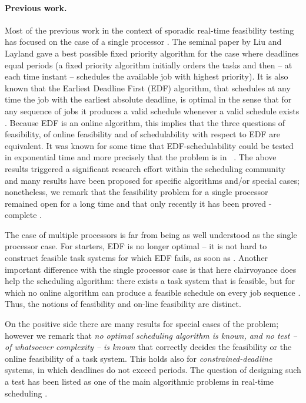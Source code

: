 \documentclass{llncs}
\newcommand{\conp}{\ccconp}
\begin{document}
\paragraph{Previous work.}
Most of the previous work in the context of sporadic real-time feasibility testing has focused on the case of a single processor \cite{Baruah:2003}. The seminal paper by Liu and Layland  \cite{Liu:1973} gave a best possible fixed priority algorithm for the case where deadlines equal periods (a fixed priority algorithm initially orders the tasks and then -- at each time instant -- schedules the available job with highest priority).  
It is also known that  the Earliest Deadline First (EDF) algorithm, that schedules at any time the job with the earliest absolute deadline, is optimal in the sense that for any sequence of jobs it produces a valid schedule whenever a valid schedule exists \cite{Dertouzos:1974}. Because EDF is an online algorithm, this implies that the three questions of feasibility, of online feasibility and of schedulability with respect to EDF are equivalent. It was known for some time that EDF-schedulability could be tested in exponential time and more precisely that the problem is in \conp\ \cite{Baruah:1990}. 
The above results triggered a significant research effort within the scheduling community and many results have been proposed for specific algorithms and/or special cases; nonetheless, we remark that the feasibility problem for a single processor remained open for a long time and that only recently it has been proved \conp-complete \cite{Eisenbrand:2010}. 


The case of multiple processors is far from being as well understood as the single processor case. For starters, EDF is no longer optimal -- it is not hard to construct feasible task systems for which EDF fails, as soon as .  Another important difference with the single processor case is that here clairvoyance does help the scheduling algorithm: there exists a task system that is feasible, but for which no online algorithm can produce a feasible schedule on every job sequence \cite{Fisher:2009}. Thus, the notions of feasibility and on-line feasibility are distinct.  


On the positive side there are many results for special cases of the problem; however we remark that \emph{no optimal scheduling algorithm is known, and no test -- of whatsoever complexity -- is known} that correctly decides the feasibility or the online feasibility of a task system. This holds also for \emph{constrained-deadline} systems, in which deadlines do not exceed periods. The question of designing such a test has been listed as one of the main algorithmic problems in real-time scheduling \cite{Baruah:2009:open}.
\end{document}
